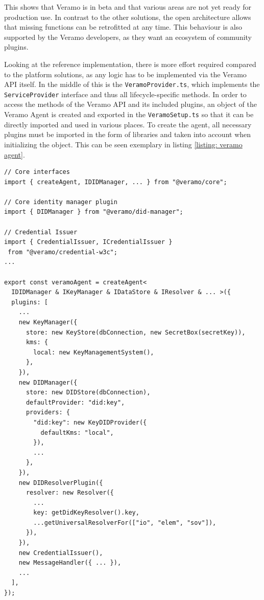     This shows that Veramo is in beta and that various areas are not yet ready for production use. In contrast to the other solutions, the open architecture allows that missing functions can be retrofitted at any time. This behaviour is also supported by the Veramo developers, as they want an ecosystem of community plugins.
    
    Looking at the reference implementation, there is more effort required compared to the platform solutions, as any logic has to be implemented via the Veramo API itself. In the middle of this is the \texttt{VeramoProvider.ts}, which implements the \texttt{ServiceProvider} interface and thus all lifecycle-specific methods. In order to access the methods of the Veramo API and its included plugins, an object of the Veramo Agent is created and exported in the \texttt{VeramoSetup.ts} so that it can be directly imported and used in various places. To create the agent, all necessary plugins must be imported in the form of libraries and taken into account when initializing the object. This can be seen exemplary in listing \ref{listing: veramo agent}. 
    \newline
    \begin{lstlisting}[style=ES6, caption=Veramo agent creation, label={listing: veramo agent}]
// Core interfaces
import { createAgent, IDIDManager, ... } from "@veramo/core";

// Core identity manager plugin
import { DIDManager } from "@veramo/did-manager";

// Credential Issuer
import { CredentialIssuer, ICredentialIssuer } 
 from "@veramo/credential-w3c";
...

export const veramoAgent = createAgent<
  IDIDManager & IKeyManager & IDataStore & IResolver & ... >({
  plugins: [
    ...
    new KeyManager({
      store: new KeyStore(dbConnection, new SecretBox(secretKey)),
      kms: {
        local: new KeyManagementSystem(),
      },
    }),
    new DIDManager({
      store: new DIDStore(dbConnection),
      defaultProvider: "did:key",
      providers: {
        "did:key": new KeyDIDProvider({
          defaultKms: "local",
        }),
        ...
      },
    }),
    new DIDResolverPlugin({
      resolver: new Resolver({
        ...
        key: getDidKeyResolver().key,
        ...getUniversalResolverFor(["io", "elem", "sov"]),
      }),
    }),
    new CredentialIssuer(),
    new MessageHandler({ ... }),
    ...
  ],
});\end{lstlisting}
    

